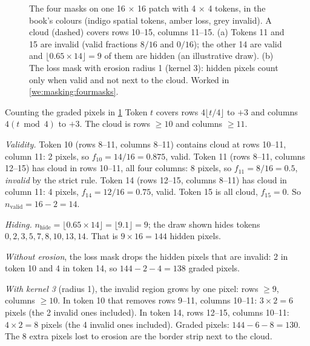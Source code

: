 \begin{figure}[htbp]
\caption{The four masks on one 16 $\times$ 16 patch with 4 $\times$ 4 tokens, in the book's colours
(indigo spatial tokens, amber loss, grey invalid). A cloud (dashed) covers rows 10--15, columns 11--15.
(a) Tokens 11 and 15 are invalid (valid fractions $8/16$ and $0/16$); the other 14 are valid and
$\lfloor 0.65 \times 14 \rfloor = 9$ of them are hidden (an illustrative draw). (b) The loss mask with
erosion radius 1 (kernel 3): hidden pixels count only when valid and not next to the cloud. Worked in
\cref{we:masking:fourmasks}.}
\label{fig:masking:grids}
\end{figure}

\begin{worked}[label={we:masking:fourmasks}]{Counting the graded pixels in \cref{fig:masking:grids}}
Token $t$ covers rows $4\lfloor t/4 \rfloor$ to $+3$ and columns $4(t \bmod 4)$ to $+3$. The cloud is
rows $\ge 10$ and columns $\ge 11$.

\emph{Validity.} Token 10 (rows 8--11, columns 8--11) contains cloud at rows 10--11, column 11: 2
pixels, so $f_{10} = 14/16 = 0.875$, valid. Token 11 (rows 8--11, columns 12--15) has cloud in rows
10--11, all four columns: 8 pixels, so $f_{11} = 8/16 = 0.5$, \emph{invalid} by the strict rule. Token
14 (rows 12--15, columns 8--11) has cloud in column 11: 4 pixels, $f_{14} = 12/16 = 0.75$, valid.
Token 15 is all cloud, $f_{15} = 0$. So $n_{\text{valid}} = 16 - 2 = 14$.

\emph{Hiding.} $n_{\text{hide}} = \lfloor 0.65 \times 14 \rfloor = \lfloor 9.1 \rfloor = 9$; the draw
shown hides tokens $0, 2, 3, 5, 7, 8, 10, 13, 14$. That is $9 \times 16 = 144$ hidden pixels.

\emph{Without erosion}, the loss mask drops the hidden pixels that are invalid: 2 in token 10 and 4 in
token 14, so $144 - 2 - 4 = 138$ graded pixels.

\emph{With kernel 3} (radius 1), the invalid region grows by one pixel: rows $\ge 9$, columns $\ge 10$.
In token 10 that removes rows 9--11, columns 10--11: $3 \times 2 = 6$ pixels (the 2 invalid ones
included). In token 14, rows 12--15, columns 10--11: $4 \times 2 = 8$ pixels (the 4 invalid ones
included). Graded pixels: $144 - 6 - 8 = 130$. The 8 extra pixels lost to erosion are the border strip
next to the cloud.
\end{worked}

